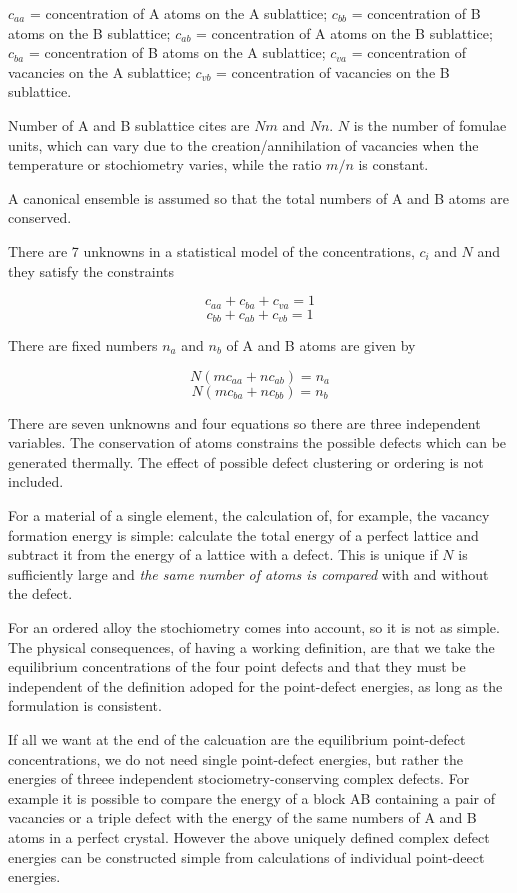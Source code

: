 \documentclass[11pt]{article}
\begin{document}
\(c_{aa}\) = concentration of A atoms on the A sublattice; 
\(c_{bb}\) = concentration of B atoms on the B sublattice;        
\(c_{ab}\) = concentration of A atoms on the B sublattice;       
\(c_{ba}\) = concentration of B atoms on the A sublattice;       
\(c_{va}\) = concentration of vacancies on the A sublattice;     
\(c_{vb}\) = concentration of vacancies on the B sublattice.

Number of A and B sublattice cites are \(Nm\) and \(Nn\). \(N\) is the number of
fomulae units, which can vary due to the creation/annihilation of vacancies
when the temperature or stochiometry varies, while the ratio \(m/n\) is
constant. 

A canonical ensemble is assumed so that the total numbers of A and B atoms are
conserved. 

There are 7 unknowns in a statistical model of the concentrations, \(c_i\) and
\(N\) and they satisfy the constraints 

\[ c_{aa} + c_{ba} + c_{va} = 1  \] 
\[ c_{bb} + c_{ab} + c_{vb} = 1  \]

There are fixed numbers \(n_a\) and \(n_b\) of A and B atoms are given by 

\[ N ( m c_{aa}  +  n c_{ab} )  =  n_a \]
\[ N ( m c_{ba}  +  n c_{bb} )  =  n_b \]

There are seven unknowns and four equations so there are three independent
variables. The conservation of atoms constrains the possible defects which can
be generated thermally. The effect of possible defect clustering or ordering
is not included. 


For a material of a single element, the calculation of, for example, the
vacancy formation energy is simple: calculate the total energy of a perfect
lattice and subtract it from the energy of a lattice with a defect. This is
unique if \(N\) is sufficiently large and \emph{the same number of atoms is compared}
with and without the defect. 

For an ordered alloy the stochiometry comes into account, so it is not as
simple. The physical consequences, of having a working definition, are that we
take the equilibrium concentrations of the four point defects and that they
must be independent of the definition adoped for the point-defect energies, as
long as the formulation is consistent. 

If all we want at the end of the calcuation are the equilibrium point-defect
concentrations, we do not need single point-defect energies, but rather the
energies of threee independent stociometry-conserving complex defects. For
example it is possible to compare the energy of a block AB containing a pair of
vacancies or a triple defect with the energy of the same numbers of A and B
atoms in a perfect crystal. However the above uniquely defined complex defect
energies can be constructed simple from calculations of individual point-deect
energies. 
\end{document}
